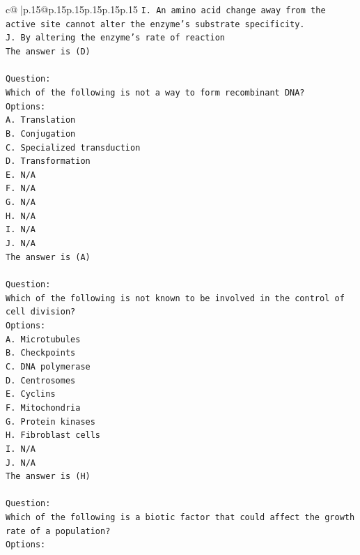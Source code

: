 \documentclass{article}
\begin{document}
{\begin{supertabular}{c@{$\;$}|p{.15\linewidth}@{}p{.15\linewidth}p{.15\linewidth}p{.15\linewidth}p{.15\linewidth}p{.15\linewidth}}
{{{\texttt{I. An amino acid change away from the active site cannot alter the enzyme’s substrate specificity.} \\
\texttt{J. By altering the enzyme's rate of reaction} \\
\texttt{The answer is (D)} \\
\\ 
\texttt{Question:} \\
\texttt{Which of the following is not a way to form recombinant DNA?} \\
\texttt{Options:} \\
\texttt{A. Translation} \\
\texttt{B. Conjugation} \\
\texttt{C. Specialized transduction} \\
\texttt{D. Transformation} \\
\texttt{E. N/A} \\
\texttt{F. N/A} \\
\texttt{G. N/A} \\
\texttt{H. N/A} \\
\texttt{I. N/A} \\
\texttt{J. N/A} \\
\texttt{The answer is (A)} \\
\\ 
\texttt{Question:} \\
\texttt{Which of the following is not known to be involved in the control of cell division?} \\
\texttt{Options:} \\
\texttt{A. Microtubules} \\
\texttt{B. Checkpoints} \\
\texttt{C. DNA polymerase} \\
\texttt{D. Centrosomes} \\
\texttt{E. Cyclins} \\
\texttt{F. Mitochondria} \\
\texttt{G. Protein kinases} \\
\texttt{H. Fibroblast cells} \\
\texttt{I. N/A} \\
\texttt{J. N/A} \\
\texttt{The answer is (H)} \\
\\ 
\texttt{Question:} \\
\texttt{Which of the following is a biotic factor that could affect the growth rate of a population?} \\
\texttt{Options:} \\
}}}
\end{supertabular}}
\end{document}
